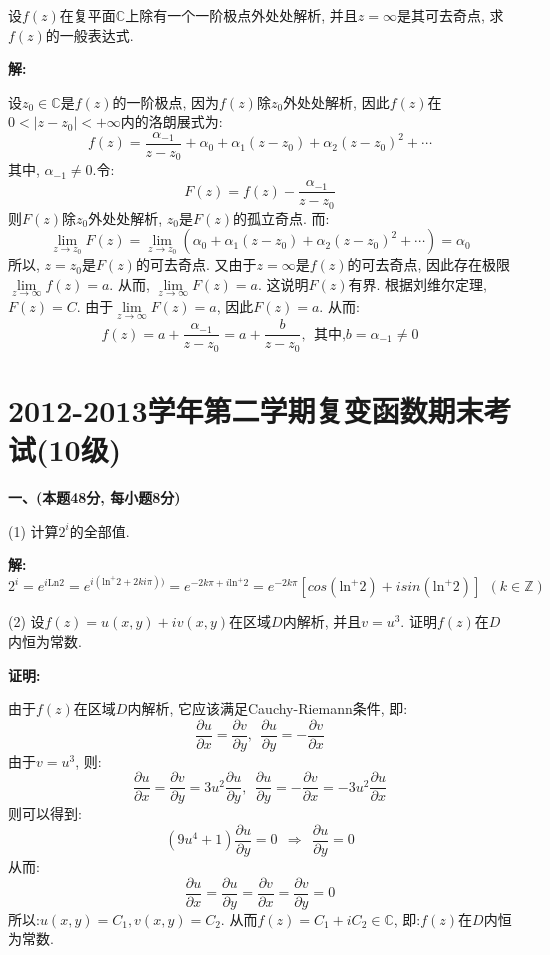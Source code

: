 \documentclass{article}
\begin{document}
设$f(z)$在复平面$\mathbb{C}$上除有一个一阶极点外处处解析, 并且$z = \infty$是其可去奇点, 求$f(z)$的一般表达式. 

\textbf{解:}

设$z_0 \in \mathbb{C}$是$f(z)$的一阶极点, 因为$f(z)$除$z_0$外处处解析, 因此$f(z)$在$0<|z-z_0|<+\infty$内的洛朗展式为:
$$ f(z) = \dfrac{\alpha_{-1}}{z-z_0} + \alpha_0 + \alpha_1(z-z_0) + \alpha_2 (z-z_0)^2 + \cdots $$
其中, $\alpha_{-1} \neq 0$.令:
$$ F(z) = f(z) - \dfrac{\alpha_{-1}}{z-z_0} $$
则$F(z)$除$z_0$外处处解析, $z_0$是$F(z)$的孤立奇点. 而:
$$ \lim\limits_{z \rightarrow z_0} F(z) = \lim\limits_{z \rightarrow z_0} (\alpha_0 + \alpha_1(z-z_0) + \alpha_2(z-z_0)^2 + \cdots) = \alpha_0 $$
所以, $z= z_0$是$F(z)$的可去奇点. 又由于$ z = \infty$是$f(z)$的可去奇点, 因此存在极限$\lim\limits_{z \rightarrow \infty} f(z) = a$. 从而, $\lim\limits_{z \rightarrow \infty} F(z) = a$. 这说明$F(z)$有界. 根据刘维尔定理, $F(z) = C$. 由于$\lim\limits_{z \rightarrow \infty} F(z) = a$, 因此$F(z) = a$. 从而:
$$ f(z) = a + \dfrac{\alpha_{-1}}{z-z_0} = a + \dfrac{b}{z-z_0}, \ \ \text{其中,} b = \alpha_{-1} \neq 0 $$

\newpage

\section{2012-2013学年第二学期复变函数期末考试(10级)}
\textbf{一、(本题48分, 每小题8分)}

(1) 计算$2^i$的全部值. 

\textbf{解:} 
$$ 2^i = e^{i\text{Ln}2} = e^{i(\text{ln}^+2 + 2ki\pi))} = e^{-2k\pi + i\text{ln}^+2} = e^{-2k\pi}\left[cos(\text{ln}^+2)+isin(\text{ln}^+2)  \right] \ \ (k \in \mathbb{Z})$$ 



(2) 设$f(z) = u(x, y) + iv(x,y)$在区域$D$内解析, 并且$v = u^3$. 证明$f(z)$在$D$内恒为常数. 

\textbf{证明:} 

由于$f(z)$在区域$D$内解析, 它应该满足Cauchy-Riemann条件, 即:
$$ \dfrac{\partial u}{\partial x} = \dfrac{\partial v}{\partial y}, \ \ \dfrac{\partial u}{\partial y} = -\dfrac{\partial v}{\partial x} $$
由于$v = u^3$, 则:
$$ \dfrac{\partial u}{\partial x} = \dfrac{\partial v}{\partial y} = 3u^2 \dfrac{\partial u}{\partial y}, \ \ \dfrac{\partial u}{\partial y} = -\dfrac{\partial v}{\partial x} = -3u^2\dfrac{\partial u}{\partial x}    $$
则可以得到:
$$ (9u^4 + 1)\dfrac{\partial u}{\partial y} = 0 \ \ \Rightarrow \ \ \dfrac{\partial u}{\partial y} = 0 $$
从而:
$$ \dfrac{\partial u}{\partial x} = \dfrac{\partial u}{\partial y} = \dfrac{\partial v}{\partial x} = \dfrac{\partial v}{\partial y} = 0 $$
所以:$u(x, y) = C_1, v(x, y) = C_2$. 从而$f(z) = C_1 + iC_2 \in \mathbb{C}$, 即:$f(z)$在$D$内恒为常数. \\  \\  
\end{document}
